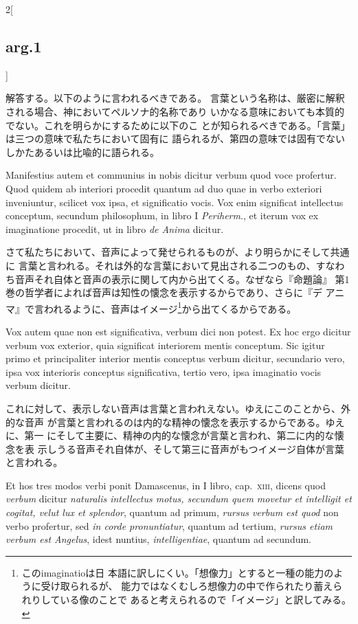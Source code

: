\documentclass[paper=a4paper,fontsize=10pt,jafontsize=9pt,titlepage]{jlreq}
\begin{document}
\begin{paracol}{2}[\subsection{arg.1}]
\switchcolumn

解答する。以下のように言われるべきである。
言葉という名称は、厳密に解釈される場合、神においてペルソナ的名称であり
 いかなる意味においても本質的でない。これを明らかにするために以下のこ
 とが知られるべきである。「言葉」は三つの意味で私たちにおいて固有に
 語られるが、第四の意味では固有でないしかたあるいは比喩的に語られる。

\switchcolumn*

Manifestius
 autem et communius in nobis dicitur verbum quod voce profertur. 
Quod
 quidem ab interiori procedit quantum ad duo quae in verbo exteriori
 inveniuntur, scilicet vox ipsa, et significatio vocis. Vox enim
 significat intellectus conceptum, secundum philosophum, in libro I
 {\itshape Periherm}., et iterum vox ex imaginatione procedit, ut in libro {\itshape de
 Anima} dicitur.

\switchcolumn

さて私たちにおいて、音声によって発せられるものが、より明らかにそして共通に
 言葉と言われる。それは外的な言葉において見出される二つのもの、すなわ
 ち音声それ自体と音声の表示に関して内から出てくる。なぜなら『命題論』
 第1巻の哲学者によれば音声は知性の懐念を表示するからであり、さらに『デ
 アニマ』で言われるように、音声はイメージ\footnote{このimaginatioは日
 本語に訳しにくい。「想像力」とすると一種の能力のように受け取られるが、
 能力ではなくむしろ想像力の中で作られたり蓄えられりしている像のことで
 あると考えられるので「イメージ」と訳してみる。}から出てくるからである。

\switchcolumn*

Vox autem quae non est significativa, verbum dici non
 potest. Ex hoc ergo dicitur verbum vox exterior, quia significat
 interiorem mentis conceptum. Sic igitur primo et principaliter
 interior mentis conceptus verbum dicitur, secundario vero, ipsa vox
 interioris conceptus significativa, tertio vero, ipsa imaginatio
 vocis verbum dicitur.

\switchcolumn

これに対して、表示しない音声は言葉と言われえない。ゆえにこのことから、外的な音声
が言葉と言われるのは内的な精神の懐念を表示するからである。ゆえに、第一
 にそして主要に、精神の内的な懐念が言葉と言われ、第二に内的な懐念を表
 示しうる音声それ自体が、そして第三に音声がもつイメージ自体が言葉と言われる。

\switchcolumn*

Et hos tres modos verbi ponit Damascenus, in I
 libro, cap.~{\scshape xiii}, dicens quod {\itshape verbum} dicitur
 {\itshape naturalis intellectus motus, secundum quem movetur et intelligit et cogitat, velut lux et
 splendor}, quantum ad primum, {\itshape rursus verbum est quod} non verbo
 profertur, sed {\itshape in corde pronuntiatur}, quantum ad tertium, {\itshape rursus
 etiam verbum est Angelus}, idest nuntius, {\itshape intelligentiae}, quantum ad
 secundum.


\end{paracol}
\end{document}
